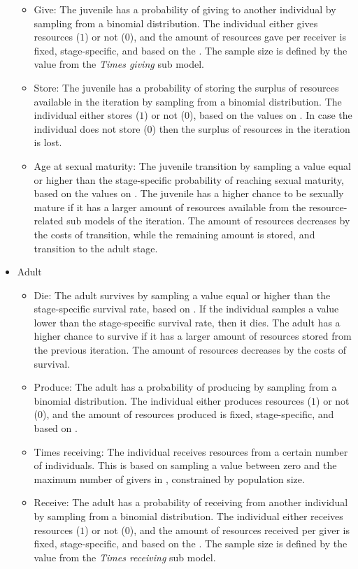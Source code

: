 \documentclass{article}
\begin{document}
\begin{itemize}
\begin{itemize}
        \item Give: The juvenile has a probability of giving to another individual by sampling from a binomial distribution. The individual either gives resources ($1$) or not ($0$), and the amount of resources gave per receiver is fixed, stage-specific, and based on the \cite{gurven2004give}. The sample size is defined by the value from the \emph{Times giving} sub model. 
        \item Store: The juvenile has a probability of storing the surplus of resources available in the iteration by sampling from a binomial distribution. The individual either stores ($1$) or not ($0$), based on the values on \citep{bowles2011cultivation}. In case the individual does not store ($0$) then the surplus of resources in the iteration is lost.
        \item Age at sexual maturity: The juvenile transition by sampling a value equal or higher than the stage-specific probability of reaching sexual maturity, based on the values on \citep{ellison2017reproductive}. The juvenile has a higher chance to be sexually mature if it has a larger amount of resources available from the resource-related sub models of the iteration. The amount of resources decreases by the costs of transition, while the remaining amount is stored, and transition to the adult stage.
    \end{itemize}
    \item Adult
    \begin{itemize}
        \item Die: The adult survives by sampling a value equal or higher than the stage-specific survival rate, based on \cite{gurven2007longevity}. If the individual samples a value lower than the stage-specific survival rate, then it dies. The adult has a higher chance to survive if it has a larger amount of resources stored from the previous iteration. The amount of resources decreases by the costs of survival.
        \item Produce: The adult has a probability of producing by sampling from a binomial distribution. The individual either produces resources ($1$) or not ($0$), and the amount of resources produced is fixed, stage-specific, and based on \cite{koster2020life}.
        \item Times receiving: The individual receives resources from a certain number of individuals. This is based on sampling a value between zero and the maximum number of givers in \cite{gurven2004give}, constrained by population size.
        \item Receive: The adult has a probability of receiving from another individual by sampling from a binomial distribution. The individual either receives resources ($1$) or not ($0$), and the amount of resources received per giver is fixed, stage-specific, and based on the \cite{gurven2004give}. The sample size is defined by the value from the \emph{Times receiving} sub model. 

\end{itemize}
\end{itemize}
\end{document}
